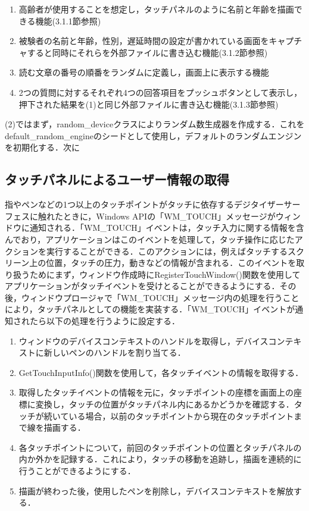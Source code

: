 \begin{enumerate}[leftmargin=*]
  \item 高齢者が使用することを想定し，タッチパネルのように名前と年齢を描画できる機能(3.1.1節参照)
  \item 被験者の名前と年齢，性別，遅延時間の設定が書かれている画面をキャプチャすると同時にそれらを外部ファイルに書き込む機能(3.1.2節参照)
  \item 読む文章の番号の順番をランダムに定義し，画面上に表示する機能
  \item 2つの質問に対するそれぞれ4つの回答項目をプッシュボタンとして表示し，押下された結果を(1)と同じ外部ファイルに書き込む機能(3.1.3節参照)
\end{enumerate}
(2)ではまず，random\_deviceクラスによりランダム数生成器を作成する．これをdefault\_random\_engineのシードとして使用し，デフォルトのランダムエンジンを初期化する．次に
\subsection{タッチパネルによるユーザー情報の取得}
指やペンなどの1つ以上のタッチポイントがタッチに依存するデジタイザーサーフェスに触れたときに，Windows APIの「WM\_TOUCH」メッセージがウィンドウに通知される．「WM\_TOUCH」イベントは，タッチ入力に関する情報を含んでおり，アプリケーションはこのイベントを処理して，タッチ操作に応じたアクションを実行することができる．このアクションには，例えばタッチするスクリーン上の位置，タッチの圧力，動きなどの情報が含まれる．このイベントを取り扱うためにまず，ウィンドウ作成時にRegisterTouchWindow()関数を使用してアプリケーションがタッチイベントを受けとることができるようにする．その後，ウィンドウプロージャで「WM\_TOUCH」メッセージ内の処理を行うことにより，タッチパネルとしての機能を実装する．「WM\_TOUCH」イベントが通知されたら以下の処理を行うように設定する．
\begin{enumerate}[leftmargin=*]
  \item ウィンドウのデバイスコンテキストのハンドルを取得し，デバイスコンテキストに新しいペンのハンドルを割り当てる．
  \item GetTouchInputInfo()関数を使用して，各タッチイベントの情報を取得する．
  \item 取得したタッチイベントの情報を元に，タッチポイントの座標を画面上の座標に変換し，タッチの位置がタッチパネル内にあるかどうかを確認する．タッチが続いている場合，以前のタッチポイントから現在のタッチポイントまで線を描画する．
  \item 各タッチポイントについて，前回のタッチポイントの位置とタッチパネルの内か外かを記録する．これにより，タッチの移動を追跡し，描画を連続的に行うことができるようにする．
  \item 描画が終わった後，使用したペンを削除し，デバイスコンテキストを解放する．
\end{enumerate}

